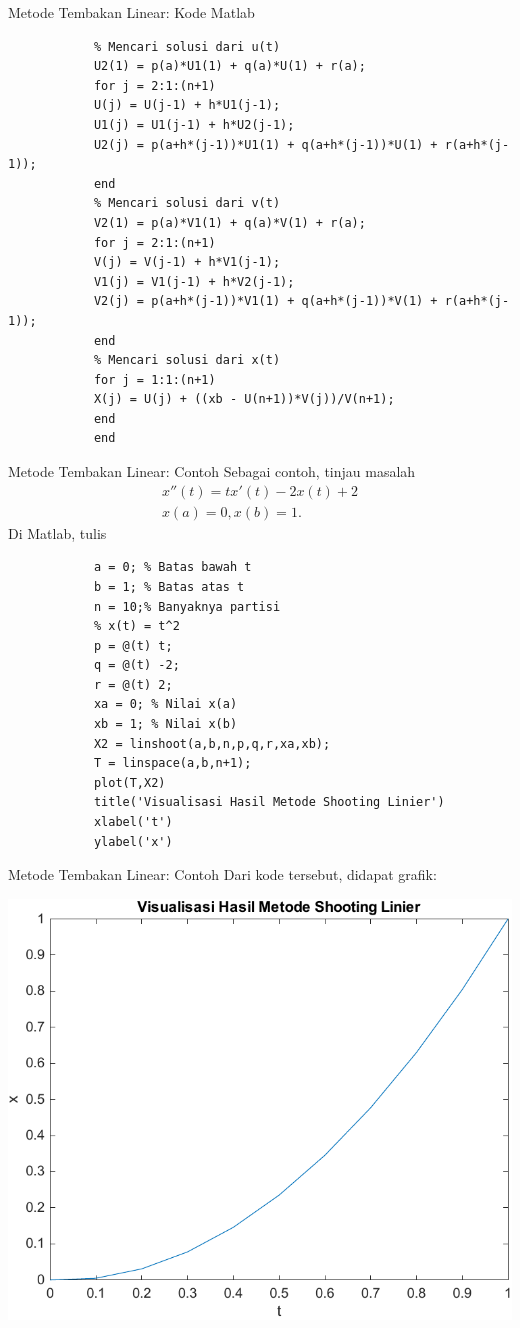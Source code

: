 \documentclass[xcolor={dvipsnames}, 9pt]{beamer}
\begin{document}
	\begin{frame}[fragile]{Metode Tembakan Linear: Kode Matlab}
		\begin{verbatim}
			% Mencari solusi dari u(t)
			U2(1) = p(a)*U1(1) + q(a)*U(1) + r(a);
			for j = 2:1:(n+1)
			U(j) = U(j-1) + h*U1(j-1);
			U1(j) = U1(j-1) + h*U2(j-1);
			U2(j) = p(a+h*(j-1))*U1(1) + q(a+h*(j-1))*U(1) + r(a+h*(j-1));
			end
			% Mencari solusi dari v(t)
			V2(1) = p(a)*V1(1) + q(a)*V(1) + r(a);
			for j = 2:1:(n+1)
			V(j) = V(j-1) + h*V1(j-1);
			V1(j) = V1(j-1) + h*V2(j-1);
			V2(j) = p(a+h*(j-1))*V1(1) + q(a+h*(j-1))*V(1) + r(a+h*(j-1));
			end
			% Mencari solusi dari x(t)
			for j = 1:1:(n+1)
			X(j) = U(j) + ((xb - U(n+1))*V(j))/V(n+1);
			end
			end
		\end{verbatim}
	\end{frame}
    \begin{frame}[fragile]{Metode Tembakan Linear: Contoh}
    	Sebagai contoh, tinjau masalah
    	\begin{align*}
    		x''(t) = tx'(t) - 2x(t) + 2 \\
    		x(a) = 0, x(b) = 1.
    	\end{align*}
    	Di Matlab, tulis
    	\begin{verbatim}
    		a = 0; % Batas bawah t
    		b = 1; % Batas atas t
    		n = 10;% Banyaknya partisi
    		% x(t) = t^2
    		p = @(t) t;
    		q = @(t) -2;
    		r = @(t) 2;
    		xa = 0; % Nilai x(a)
    		xb = 1; % Nilai x(b)
    		X2 = linshoot(a,b,n,p,q,r,xa,xb);
    		T = linspace(a,b,n+1);
    		plot(T,X2)
    		title('Visualisasi Hasil Metode Shooting Linier')
    		xlabel('t')
    		ylabel('x')
    	\end{verbatim}
    \end{frame}
    \begin{frame}{Metode Tembakan Linear: Contoh}
    	Dari kode tersebut, didapat grafik:
    	\begin{center}
    		\includegraphics[scale=0.4]{linearshooting.pdf}
    	\end{center}
    \end{frame}
\end{document}
